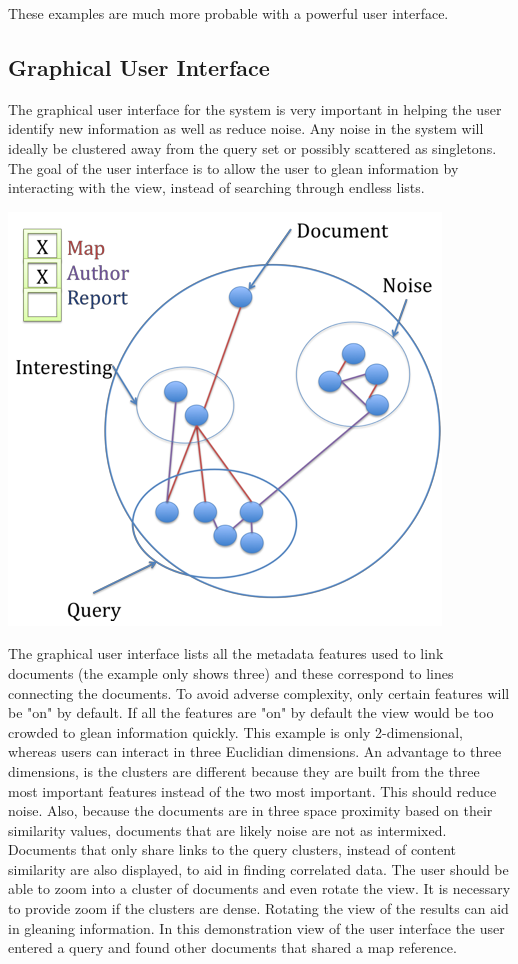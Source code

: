 \documentclass[11pt]{article}
\begin{document}
These examples are much more probable with a powerful user interface.

\subsection{Graphical User Interface}

The graphical user interface for the system is very important in helping the user identify new information as well as reduce noise.
Any noise in the system will ideally be clustered away from the query set or possibly scattered as singletons.
The goal of the user interface is to allow the user to glean information by interacting with the view, instead of searching through endless lists.

\begin{center}
\includegraphics[keepaspectratio=true,scale=0.75]{user_interface.png}
\end{center}

The graphical user interface lists all the metadata features used to link documents (the example only shows three) and these correspond to lines connecting the documents.
To avoid adverse complexity, only certain features will be "on" by default.
If all the features are "on" by default the view would be too crowded to glean information quickly.
This example is only 2-dimensional, whereas users can interact in three Euclidian dimensions.
An advantage to three dimensions, is the clusters are different because they are built from the three most important features instead of the two most important.
This should reduce noise.
Also, because the documents are in three space proximity based on their similarity values, documents that are likely noise are not as intermixed.
Documents that only share links to the query clusters, instead of content similarity are also displayed, to aid in finding correlated data.
The user should be able to zoom into a cluster of documents and even rotate the view.
It is necessary to provide zoom if the clusters are dense.
Rotating the view of the results can aid in gleaning information.
In this demonstration view of the user interface the user entered a query and found other documents that shared a map reference.
\end{document}
